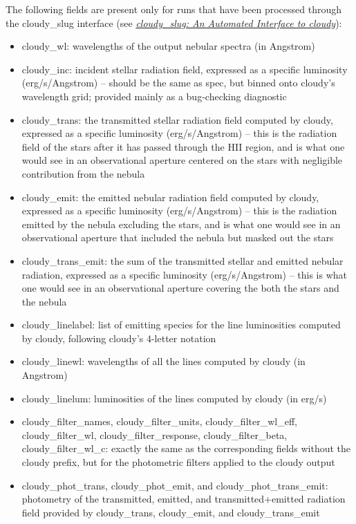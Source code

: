 \documentclass[letterpaper,10pt,english]{sphinxmanual}
\begin{document}
The following fields are present only for runs that have been processed through the cloudy\_slug interface (see {\hyperref[cloudy:sec-cloudy-slug]{\emph{cloudy\_slug: An Automated Interface to cloudy}}}):
\begin{itemize}
\item {} 
cloudy\_wl: wavelengths of the output nebular spectra (in Angstrom)

\item {} 
cloudy\_inc: incident stellar radiation field, expressed as a specific luminosity (erg/s/Angstrom) -- should be the same as spec, but binned onto cloudy's wavelength grid; provided mainly as a bug-checking diagnostic

\item {} 
cloudy\_trans: the transmitted stellar radiation field computed by cloudy, expressed as a specific luminosity (erg/s/Angstrom) -- this is the radiation field of the stars after it has passed through the HII region, and is what one would see in an observational aperture centered on the stars with negligible contribution from the nebula

\item {} 
cloudy\_emit: the emitted nebular radiation field computed by cloudy, expressed as a specific luminosity (erg/s/Angstrom) -- this is the radiation emitted by the nebula excluding the stars, and is what one would see in an observational aperture that included the nebula but masked out the stars

\item {} 
cloudy\_trans\_emit: the sum of the transmitted stellar and emitted nebular radiation, expressed as a specific luminosity (erg/s/Angstrom) -- this is what one would see in an observational aperture covering the both the stars and the nebula

\item {} 
cloudy\_linelabel: list of emitting species for the line luminosities computed by cloudy, following cloudy's 4-letter notation

\item {} 
cloudy\_linewl: wavelengths of all the lines computed by cloudy (in Angstrom)

\item {} 
cloudy\_linelum: luminosities of the lines computed by cloudy (in erg/s)

\item {} 
cloudy\_filter\_names, cloudy\_filter\_units, cloudy\_filter\_wl\_eff, cloudy\_filter\_wl, cloudy\_filter\_response, cloudy\_filter\_beta, cloudy\_filter\_wl\_c: exactly the same as the corresponding fields without the cloudy prefix, but for the photometric filters applied to the cloudy output

\item {} 
cloudy\_phot\_trans, cloudy\_phot\_emit, and cloudy\_phot\_trans\_emit: photometry of the transmitted, emitted, and transmitted+emitted radiation field provided by cloudy\_trans, cloudy\_emit, and cloudy\_trans\_emit

\end{itemize}
\end{document}
